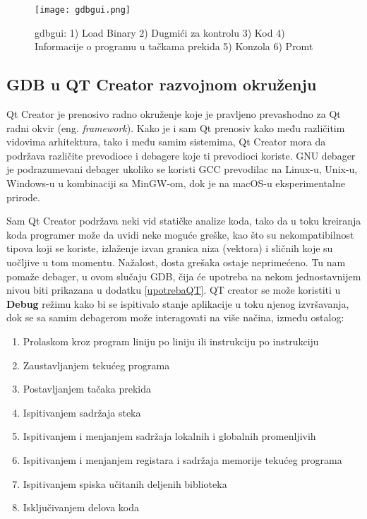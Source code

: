 \documentclass[a4paper]{article}
\begin{document}
\begin{figure}[h!]
\begin{center}
\texttt{[image: gdbgui.png]}
\end{center}
\caption{gdbgui: 1) Load Binary 2) Dugmići za kontrolu 3) Kod 4) Informacije o programu u tačkama prekida 5) Konzola 6) Promt}
\label{fig:gdbgui}
\end{figure}

\subsection{GDB u QT Creator razvojnom okruženju}
\label{subsec:QT}

Qt Creator je prenosivo radno okruženje koje je pravljeno prevashodno za Qt radni okvir (eng. \textit{framework}).
Kako je i sam Qt prenosiv kako među različitim vidovima arhitektura, tako i među samim sistemima, Qt Creator
mora da podržava različite prevodioce i debagere koje ti prevodioci koriste. GNU debager je podrazumevani debager
ukoliko se koristi GCC prevodilac na Linux-u, Unix-u, Windows-u u kombinaciji sa MinGW-om, dok je na macOS-u
eksperimentalne prirode\cite{QT}. 

Sam Qt Creator podržava neki vid statičke analize koda, tako da u toku kreiranja koda programer može da 
uvidi neke moguće greške, kao što su nekompatibilnost tipova koji se koriste, izlaženje izvan granica niza (vektora) 
i sličnih koje su uočljive u tom momentu. Nažalost, dosta grešaka ostaje neprimećeno. Tu nam pomaže debager,
u ovom slučaju GDB, čija će upotreba na nekom jednostavnijem nivou biti prikazana u dodatku \ref{upotrebaQT}. 
QT creator se može koristiti u \textbf{Debug} režimu kako bi se ispitivalo stanje aplikacije u toku njenog izvršavanja,
dok se sa samim debagerom može interagovati na više načina, između ostalog:\cite{QT} 

\begin{enumerate}
\item Prolaskom kroz program liniju po liniju ili instrukciju po instrukciju
\item Zaustavljanjem tekućeg programa
\item Postavljanjem tačaka prekida
\item Ispitivanjem sadržaja steka
\item Ispitivanjem i menjanjem sadržaja lokalnih i globalnih promenljivih
\item Ispitivanjem i menjanjem registara i sadržaja memorije tekućeg programa
\item Ispitivanjem spiska učitanih deljenih biblioteka
\item Isključivanjem delova koda
\end{enumerate}
\end{document}

